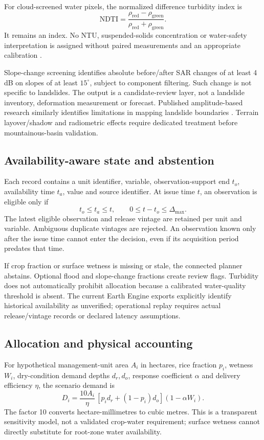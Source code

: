 \documentclass[11pt]{article}
\begin{document}
For cloud-screened water pixels, the normalized difference turbidity index is
\begin{equation}
\mathrm{NDTI}=\frac{\rho_{\mathrm{red}}-\rho_{\mathrm{green}}}
{\rho_{\mathrm{red}}+\rho_{\mathrm{green}}}.
\end{equation}
It remains an index. No NTU, suspended-solids concentration or water-safety interpretation is assigned without paired measurements and an appropriate calibration \cite{turbidity}.

Slope-change screening identifies absolute before/after SAR changes of at least 4 dB on slopes of at least $15^\circ$, subject to component filtering. Such change is not specific to landslides. The output is a candidate-review layer, not a landslide inventory, deformation measurement or forecast. Published amplitude-based research similarly identifies limitations in mapping landslide boundaries \cite{landslide}. Terrain layover/shadow and radiometric effects require dedicated treatment before mountainous-basin validation.

\subsection{Availability-aware state and abstention}
Each record contains a unit identifier, variable, observation-support end $t_o$, availability time $t_a$, value and source identifier. At issue time $t$, an observation is eligible only if
\begin{equation}
t_o\leq t_a\leq t,\qquad 0\leq t-t_o\leq \Delta_{\max}.
\end{equation}
The latest eligible observation and release vintage are retained per unit and variable. Ambiguous duplicate vintages are rejected. An observation known only after the issue time cannot enter the decision, even if its acquisition period predates that time.

If crop fraction or surface wetness is missing or stale, the connected planner abstains. Optional flood and slope-change fractions create review flags. Turbidity does not automatically prohibit allocation because a calibrated water-quality threshold is absent. The current Earth Engine exports explicitly identify historical availability as unverified; operational replay requires actual release/vintage records or declared latency assumptions.

\subsection{Allocation and physical accounting}
For hypothetical management-unit area $A_i$ in hectares, rice fraction $p_i$, wetness $W_i$, dry-condition demand depths $d_r,d_o$, response coefficient $\alpha$ and delivery efficiency $\eta$, the scenario demand is
\begin{equation}
D_i=\frac{10A_i}{\eta}\,[p_id_r+(1-p_i)d_o](1-\alpha W_i).
\end{equation}
The factor 10 converts hectare-millimetres to cubic metres. This is a transparent sensitivity model, not a validated crop-water requirement; surface wetness cannot directly substitute for root-zone water availability.
\end{document}
